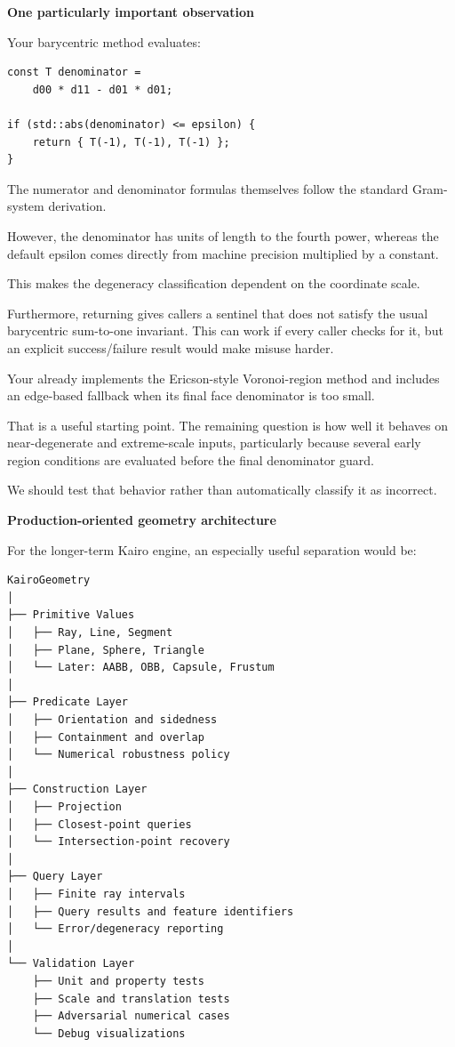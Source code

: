 \textbf{One particularly important observation}

Your  barycentric method evaluates:

\begin{verbatim}
const T denominator =
    d00 * d11 - d01 * d01;

if (std::abs(denominator) <= epsilon) {
    return { T(-1), T(-1), T(-1) };
}
\end{verbatim}

The numerator and denominator formulas themselves follow the standard Gram-system derivation.

However, the denominator has units of length to the fourth power, whereas the default epsilon comes directly from machine precision multiplied by a constant.

This makes the degeneracy classification dependent on the coordinate scale.

Furthermore, returning  gives callers a sentinel that does not satisfy the usual barycentric sum-to-one invariant. This can work if every caller checks for it, but an explicit success/failure result would make misuse harder.

Your  already implements the Ericson-style Voronoi-region method and includes an edge-based fallback when its final face denominator is too small.

That is a useful starting point. The remaining question is how well it behaves on near-degenerate and extreme-scale inputs, particularly because several early region conditions are evaluated before the final denominator guard.

We should test that behavior rather than automatically classify it as incorrect.

\textbf{Production-oriented geometry architecture}

For the longer-term Kairo engine, an especially useful separation would be:

\begin{verbatim}
KairoGeometry
│
├── Primitive Values
│   ├── Ray, Line, Segment
│   ├── Plane, Sphere, Triangle
│   └── Later: AABB, OBB, Capsule, Frustum
│
├── Predicate Layer
│   ├── Orientation and sidedness
│   ├── Containment and overlap
│   └── Numerical robustness policy
│
├── Construction Layer
│   ├── Projection
│   ├── Closest-point queries
│   └── Intersection-point recovery
│
├── Query Layer
│   ├── Finite ray intervals
│   ├── Query results and feature identifiers
│   └── Error/degeneracy reporting
│
└── Validation Layer
    ├── Unit and property tests
    ├── Scale and translation tests
    ├── Adversarial numerical cases
    └── Debug visualizations
\end{verbatim}

